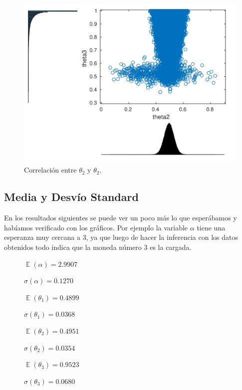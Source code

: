 \begin{figure}[H]
\centering
\begin{minipage}{0.5\textwidth}
	\includegraphics[width=1.0\textwidth]{imgs/theta2_3.png}
	\caption{\footnotesize Correlación entre $\theta_2$ y $\theta_2$.}
\end{minipage}	
\end{figure}


\subsection{Media y Desvío Standard}

En los resultados siguientes se puede ver un poco más lo que esperábamos y habíamos verificado con los gráficos. Por ejemplo la variable $\alpha$ tiene una esperanza muy cercana a 3, ya que luego de hacer la inferencia con los datos obtenidos todo indica que la moneda número 3 es la cargada.

\begin{figure}[H]
\begin{minipage}{0.5\textwidth}
 \centering

$\mathop{\mathbb{E}} (\alpha) = 2.9907$

$\sigma (\alpha) = 0.1270$

$ \mathop{\mathbb{E}} (\theta_1) = 0.4899 $

$ \sigma (\theta_1) = 0.0368 $


\end{minipage}
\begin{minipage}{0.5\textwidth}
 \centering

$ \mathop{\mathbb{E}} (\theta_2) = 0.4951 $

$ \sigma (\theta_2) = 0.0354 $

$ \mathop{\mathbb{E}} (\theta_3) = 0.9523 $

$ \sigma (\theta_3) = 0.0680 $

\end{minipage}
\end{figure}

